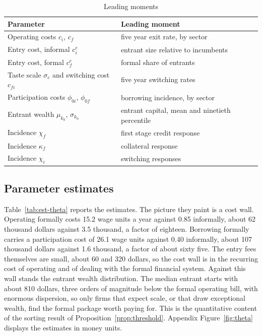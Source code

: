 \documentclass[12pt]{article}
\begin{document}
\begin{table}[H]
\centering\small
\caption{Leading moments}
\label{tab:est-identification}
\begin{tabular}{ll}
\toprule
Parameter & Leading moment \\
\midrule
Operating costs $c_{i}$, $c_{f}$ & five year exit rate, by sector \\
Entry cost, informal $c^{e}_{i}$ & entrant size relative to incumbents \\
Entry cost, formal $c^{e}_{f}$ & formal share of entrants \\
Taste scale $\sigma_{c}$ and switching cost $c_{fi}$ & five year switching rates \\
Participation costs $\phi_{0i}$, $\phi_{0f}$ & borrowing incidence, by sector \\
Entrant wealth $\mu_{k_{0}}$, $\sigma_{k_{0}}$ & entrant capital, mean and ninetieth percentile \\
Incidence $\chi_{f}$ & first stage credit response \\
Incidence $\kappa_{f}$ & collateral response \\
Incidence $\chi_{i}$ & switching responses \\
\bottomrule
\end{tabular}
\end{table}

\subsection{Parameter estimates}
\label{sec:est-results}

Table~\ref{tab:est-theta} reports the estimates. The picture they paint is a cost wall. Operating formally costs 15.2 wage units a year against 0.85 informally, about 62 thousand dollars against 3.5 thousand, a factor of eighteen. Borrowing formally carries a participation cost of 26.1 wage units against 0.40 informally, about 107 thousand dollars against 1.6 thousand, a factor of about sixty five. The entry fees themselves are small, about 60 and 320 dollars, so the cost wall is in the recurring cost of operating and of dealing with the formal financial system. Against this wall stands the entrant wealth distribution. The median entrant starts with about 810 dollars, three orders of magnitude below the formal operating bill, with enormous dispersion, so only firms that expect scale, or that draw exceptional wealth, find the formal package worth paying for. This is the quantitative content of the sorting result of Proposition~\ref{prop:threshold}. Appendix Figure~\ref{fig:theta} displays the estimates in money units.
\end{document}
